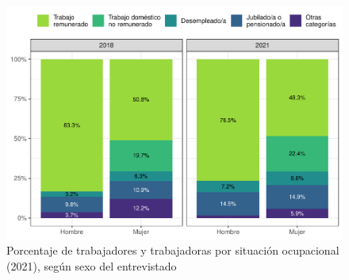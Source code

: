 \documentclass[
  12pt,
]{book}
\begin{document}
\begin{figure}

{\centering \includegraphics{reporte-elsoc_files/figure-latex/ocup-sexo-1} 

}

\caption{Porcentaje de trabajadores y trabajadoras por situación ocupacional (2021), según sexo del entrevistado}\label{fig:ocup-sexo}
\end{figure}
\end{document}
